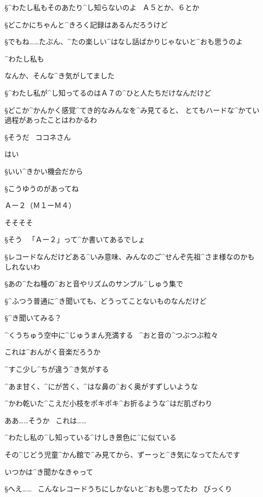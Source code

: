 \S ^{わたし}{私}もそのあたり^{し}{知}らないのよ
\ Ａ５とか、６とか

\S どこかにちゃんと^{きろく}{記録}はあるんだろうけど

\S でもね……たぶん、^{たの}{楽}しい^{はなし}{話}ばかりじゃないと^{おも}{思}うのよ

\K ^{わたし}{私}も

\K なんか、そんな^{き}{気}がしてました

\page
\S ^{わたし}{私}が^{し}{知}ってるのはＡ７の^{ひと}{人}たちだけなんだけど

\S どこか^{かんかく}{感覚}^{てき}{的}なみんなを^{み}{見}てると、
とてもハードな^{かてい}{過程}があったことはわかるわ

\S そうだ
\ ココネさん

\K はい

\S いい^{きかい}{機会}だから

\page
\S こうゆうのがあってね

\Sign Ａー２（Ｍ１ーＭ４）

\K そそそそ

\S そう
\ 「Ａー２」って^{か}{書}いてあるでしょ

\S レコードなんだけどある^{いみ}{意味}、みんなのご^{せんぞ}{先祖}^{さま}{様}なのかもしれないわ

\page
\S あの^{たね}{種}の^{おと}{音}やリズムのサンプル^{しゅう}{集}で

\S ^{ふつう}{普通}に^{き}{聞}いても、どうってことないものなんだけど

\S ^{き}{聞}いてみる？

\page[91]
\K ^{くうちゅう}{空中}に^{じゅうまん}{充満}する
\ ^{おと}{音}の^{つぶつぶ}{粒々}

\K これは^{おんがく}{音楽}だろうか

\K ^{すこ}{少}し^{ちが}{違}う^{き}{気}がする

\K ^{あま}{甘}く、^{にが}{苦}く、^{はな}{鼻}の^{おく}{奥}がすずしいような

\K ^{かわ}{乾}いた^{こえだ}{小枝}をポキポキ^{お}{折}るような^{はだ}{肌}ざわり

\K ああ……そうか
\ これは……

\K ^{わたし}{私}の^{し}{知}っている^{けしき}{景色}に^{に}{似}ている

\page[93]
\K その^{じどう}{児童}^{かん}{館}で^{み}{見}てから、ずーっと^{き}{気}になってたんです

\K いつかは^{き}{聞}かなきゃって

\S へえ……
\ こんなレコードうちにしかないと^{おも}{思}ってたわ
\ びっくり

